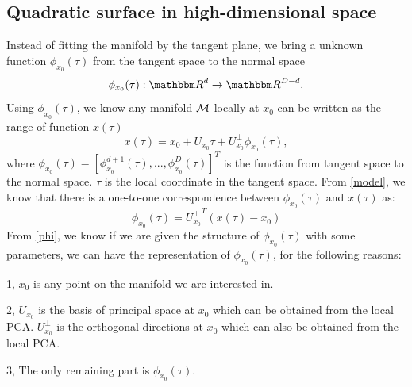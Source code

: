 \documentclass{article}
\theoremstyle{remark}
\begin{document}
\subsection{Quadratic surface in high-dimensional space }

 Instead of fitting the manifold by the tangent plane, we bring a unknown function $\phi_{x_0}(\tau)$ from the tangent space to the normal space
 \[
 \phi_{x_0}(\tau): {\mathbbm R}^d \rightarrow {\mathbbm R}^{D-d}.
 \] 
 Using  $\phi_{x_0}(\tau)$, we know any manifold $\cal M$ locally at $x_0$ can be written as the range of  function   $x(\tau)$
  \begin{equation}\label{model}
  x (\tau)=  x_0 + U_{x_0} \tau+ U_{x_0}^{\perp} \phi_{x_0} (\tau),
  \end{equation}
where $\phi_{x_0}(\tau)=[\phi_{x_0}^{d+1}(\tau),...,\phi_{x_0}^{D}(\tau)]^T$  is the function from tangent space to the normal space. $\tau$ is the local coordinate in the tangent space.
From \eqref{model}, we know that there is a one-to-one correspondence between $\phi_{x_0} (\tau)$ and $x(\tau)$ as: %
\begin{equation}\label{phi}
\phi_{x_0}(\tau) = {U_{x_0}^{\perp}}^{T}(x(\tau)-x_0)
\end{equation}
From \eqref{phi}, we know if we are given the structure of $\phi_{x_0}(\tau)$ with some parameters, we can have the representation of $\phi_{x_0}(\tau)$, for the following reasons:

1, $x_0$ is any point on the manifold we are interested in.

2,  $U_{x_0}$ is the basis of principal space at $x_0$ which can be obtained from the local PCA. $U_{x_0}^{\perp}$ is the orthogonal directions at $x_0$ which can also be obtained from the local PCA.

3, The only remaining part is  $\phi_{x_0} (\tau)$.
\end{document}
